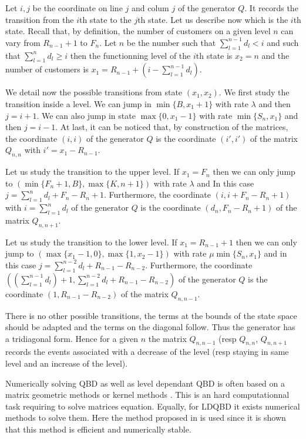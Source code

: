 \documentclass[conference]{IEEEtran}
\begin{document}
\begin{IEEEproof}
Let $i,j$ be the coordinate on line $j$ and colum $j$ of the generator $Q$. It records the transition
from the $i$th state to the $j$th state.
Let us describe now which is the $i$th state. Recall that, by definition, the number of customers on a given level 
$n$ can vary from $R_{n-1}+1$ to $F_n$. Let $n$ be the number such that
$\sum_{l=1}^{n-1} d_l <i$ and such that $\sum_{l=1}^{n} d_l  \geq i$ then the functionning level of the $i$th state is
$x_2=n$ and the number of customers is $x_1=R_{n-1}+\left(i-\sum_{l=1}^{n-1} d_l\right)$.

We detail now the possible transitions from state $(x_1,x_2)$.
We first study the transition inside a level. We can jump in $\min\{B,x_1+1\}$ with rate $\lambda$ and then $j=i+1$.
We can also jump in state $\max\{0,x_1-1\}$ with rate $\min\{S_n,x_1\}$ and then $j=i-1$.
At last, it can be noticed that, by construction of the matrices, the coordinate $(i,i)$ of the generator $Q$
is the coordinate $(i',i')$ of the matrix $Q_{n,n}$ with $i'=x_1-R_{n-1}$.

Let us study the transition to the upper level. If $x_1=F_n$ then 
we can only jump to $(\min\{F_n+1,B\},\max\{K,n+1\})$ with rate $\lambda$ and
In this case $j=\sum_{l=1}^{n} d_l + F_n-R_{n}+1$.
Furthermore, the coordinate $(i,i+F_n-R_{n}+1)$ with $i=\sum_{l=1}^{n} d_l$ of the generator $Q$
is the coordinate $(d_n,F_n-R_{n}+1)$ of the matrix $Q_{n,n+1}$.

Let us study the transition to the lower level. If $x_1=R_{n-1}+1$ then 
we can only jump to $(\max\{x_1-1,0\},\max\{1,x_2-1\})$ with rate $\mu \min\{S_n,x_1\}$
and in this case $j=\sum_{l=1}^{n-2} d_l + R_{n-1} - R_{n-2}$.
Furthermore, the coordinate $((\sum_{l=1}^{n-1} d_l)+1,\sum_{l=1}^{n-2} d_l + R_{n-1} - R_{n-2})$ 
of the generator $Q$ is the coordinate $(1,R_{n-1} - R_{n-2})$ of the matrix $Q_{n,n-1}$.


There is no other possible transitions, the terms at the bounds of the state space should be adapted and
the terms on the diagonal follow. Thus the generator has a tridiagonal form.
Hence for a given $n$ the matrix $Q_{n,n-1}$ (resp $Q_{n,n}$, $Q_{n,n+1}$
records the events associated with a decrease of the level (resp staying in same level and an increase of the level).
\end{IEEEproof}

Numerically solving QBD as well as level dependant QBD is often based on a matrix geometric methods 
\cite{Neuts1981,art:latoucherama} or kernel methods \cite{gaujal2006optimal}. This is an hard computationnal task requiring to solve
matrices equation. Equally, for LDQBD it exists numerical methods to solve them. Here the method proposed in  \cite{baumann2010numerical} 
is used since it is shown that this method is efficient and numerically stable.
\end{document}
